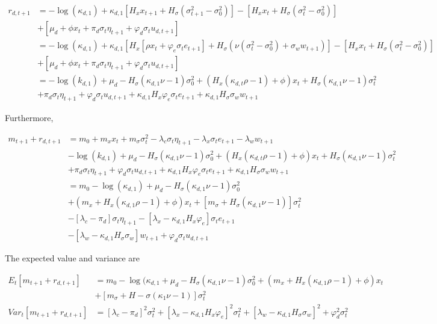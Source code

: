 \documentclass{article}
\begin{document}
\begin{enumerate}
\begin{align*}
r_{d,t+1} 
&= - \log(\kappa_{d,1}) + \kappa_{d,1} [H_x x_{t+1} + H_\sigma(\sigma_{t+1}^2 - \sigma_0^2)] - [H_x x_t + H_\sigma(\sigma_t^2 - \sigma_0^2)] \\
&+ [\mu_d + \phi x_t + \pi_d \sigma_t \eta_{t+1} + \varphi_d \sigma_t u_{d,t+1}]\\
&= - \log(\kappa_{d,1}) + \kappa_{d,1} [H_x [\rho x_t + \varphi_e \sigma_t e_{t+1}]+ H_\sigma(\nu(\sigma_t^2 - \sigma_0^2) + \sigma_w w_{t+1})] - [H_x x_t + H_\sigma(\sigma_t^2 - \sigma_0^2)] \\
&+ [\mu_d + \phi x_t + \pi_d \sigma_t \eta_{t+1} + \varphi_d \sigma_t u_{d,t+1}]\\
&= -\log(k_{d,1}) + \mu_d - H_\sigma (\kappa_{d,1} \nu - 1) \sigma_0^2 + (H_x(\kappa_{d,t} \rho - 1) + \phi) x_t + H_\sigma(\kappa_{d,1} \nu - 1) \sigma_t^2 \\
&+ \pi_d \sigma_t \eta_{t+1} + \varphi_d  \sigma_t u_{d,t+1} + \kappa_{d,1} H_x \varphi_e \sigma_t e_{t+1} + \kappa_{d,1} H_\sigma \sigma_w w_{t+1}
\end{align*}


Furthermore,

\begin{align*}
m_{t+1} + r_{d,t+1} 
&= m_0 + m_x x_t + m_\sigma \sigma_t^2 - \lambda_c \sigma_t \eta_{t+1} - \lambda_x \sigma_t e_{t+1} - \lambda_w w_{t+1} \\
&-\log(k_{d,1}) + \mu_d - H_\sigma (\kappa_{d,1} \nu - 1) \sigma_0^2 + (H_x(\kappa_{d,t} \rho - 1) + \phi) x_t + H_\sigma(\kappa_{d,1} \nu - 1) \sigma_t^2 \\
&+ \pi_d \sigma_t \eta_{t+1} + \varphi_d  \sigma_t u_{d,t+1} + \kappa_{d,1} H_x \varphi_e \sigma_t e_{t+1} + \kappa_{d,1} H_\sigma \sigma_w w_{t+1} \\
&= m_0 - \log(\kappa_{d,1}) + \mu_d - H_\sigma(\kappa_{d,1}\nu - 1) \sigma_0^2 \\
&+ (m_x + H_x (\kappa_{d,1} \rho - 1) + \phi) x_t +[m_\sigma + H_\sigma(\kappa_{d,1} \nu - 1)] \sigma_t^2 \\
&- [\lambda_c - \pi_d]\sigma_t \eta_{t+1} - [\lambda_x - \kappa_{d,1} H_x \varphi_e] \sigma_t e_{t+1} \\
&- [\lambda_w - \kappa_{d,1} H_\sigma \sigma_w]w_{t+1} + \varphi_d \sigma_t u_{d,t+1}
\end{align*}

The expected value and variance are

\begin{align*}
E_t[m_{t+1} + r_{d,t+1}] &= m_0 - \log(\kappa_{d,1} + \mu_d - H_\sigma(\kappa_{d,1} \nu - 1) \sigma^2_0 + (m_x + H_x (\kappa_{d,1} \rho - 1) + \phi) x_t \\
&+ [m_\sigma + H-\sigma(\kappa_1 \nu - 1)] \sigma_t^2\\
Var_t[m_{t+1} + r_{d,t+1}] &= [\lambda_c - \pi_d]^2 \sigma_t^2 + [\lambda_x - \kappa_{d,1} H_x \varphi_e]^2 \sigma_t^2 + [\lambda_w - \kappa_{d,1} H_\sigma \sigma_w]^2 + \varphi_d^2 \sigma_t^2
\end{align*}


\end{enumerate}
\end{document}
